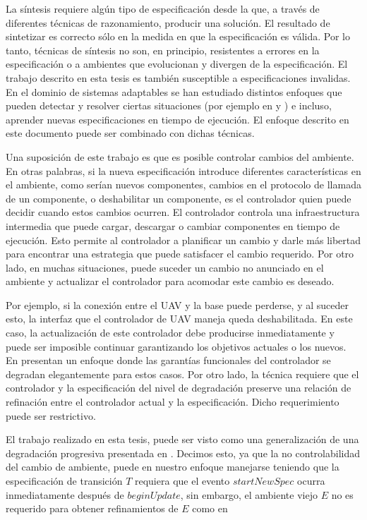La síntesis requiere algún tipo de especificación desde la que, a través de diferentes técnicas de razonamiento, producir
una solución. El resultado de sintetizar es correcto sólo en la medida en que la especificación es válida. Por lo tanto,
técnicas de síntesis no son, en principio, resistentes a errores en la especificación o a ambientes que evolucionan y
divergen de la especificación. El trabajo descrito en esta tesis es también susceptible a especificaciones invalidas. En
el dominio de sistemas adaptables se han estudiado distintos enfoques que pueden detectar y resolver ciertas situaciones
(por ejemplo en \cite{DBKMSU14} y \cite{Vromant:2011:ICL:1988008.1988037}) e incluso, aprender nuevas especificaciones
en tiempo de ejecución. El enfoque descrito en este documento puede ser combinado con dichas técnicas.

Una suposición de este trabajo es que es posible controlar cambios del ambiente. En otras palabras, si la nueva
especificación introduce diferentes características en el ambiente, como serían nuevos componentes, cambios en el protocolo
de llamada de un componente, o deshabilitar un componente, es el controlador quien puede decidir cuando estos cambios
ocurren. El controlador controla una infraestructura intermedia que puede cargar, descargar o cambiar componentes en
tiempo de ejecución. Esto permite al controlador a planificar un cambio y darle más libertad para encontrar una
estrategia que puede satisfacer el cambio requerido. Por otro lado, en muchas situaciones, puede suceder un cambio no
anunciado en el ambiente y actualizar el controlador para acomodar este cambio es deseado.

Por ejemplo, si la conexión entre el UAV y la base puede perderse, y al suceder esto, la interfaz que el controlador de UAV
maneja queda deshabilitada. En este caso, la actualización de este controlador debe producirse inmediatamente y puede
ser imposible continuar garantizando los objetivos actuales o los nuevos. En \cite{DBKMSU14} presentan un enfoque donde las
garantías funcionales del controlador se degradan elegantemente para estos casos. Por otro lado, la técnica requiere que
el controlador y la especificación del nivel de degradación preserve una relación de refinación entre el controlador
actual y la especificación. Dicho requerimiento puede ser restrictivo.

El trabajo realizado en esta tesis, puede ser visto como una generalización de una degradación progresiva presentada en
\cite{DBKMSU14}. Decimos esto, ya que la no controlabilidad del cambio de ambiente, puede en nuestro enfoque manejarse teniendo
que la especificación de transición $T$ requiera que el evento $startNewSpec$ ocurra inmediatamente después de
$beginUpdate$, sin embargo, el ambiente viejo $E$ no es requerido para obtener refinamientos de $E$ como en
\cite{DBKMSU14}

